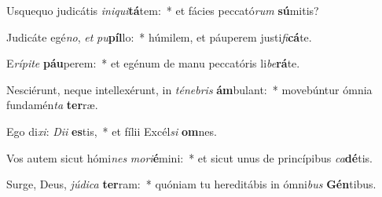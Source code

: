 \item Usquequo judicátis \textit{in}\textit{i}\textit{qui}\textbf{tá}tem:~* et fácies peccató\textit{rum} \textbf{sú}mitis?
\item Judicáte egé\textit{no}, \textit{et} \textit{pu}\textbf{píl}lo:~* húmilem, et páuperem justi\textit{fi}\textbf{cá}te.
\item E\textit{rí}\textit{pi}\textit{te} \textbf{páu}perem:~* et egénum de manu peccatóris li\textit{be}\textbf{rá}te.
\item Nesciérunt, neque intellexérunt, in \textit{té}\textit{ne}\textit{bris} \textbf{ám}bulant:~* movebúntur ómnia fundamén\textit{ta} \textbf{ter}ræ.
\item Ego di\textit{xi}: \textit{Di}\textit{i} \textbf{es}tis,~* et fílii Excél\textit{si} \textbf{om}nes.
\item Vos autem sicut hómi\textit{nes} \textit{mo}\textit{ri}\textbf{é}mini:~* et sicut unus de princípibus \textit{ca}\textbf{dé}tis.
\item Surge, Deus, \textit{jú}\textit{di}\textit{ca} \textbf{ter}ram:~* quóniam tu hereditábis in ómni\textit{bus} \textbf{Gén}tibus.
